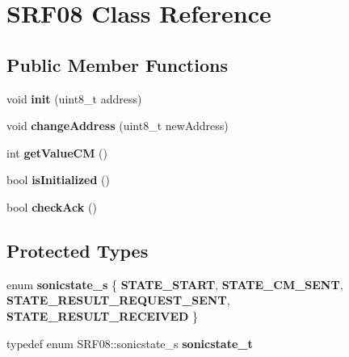 \hypertarget{class_s_r_f08}{}\section{S\+R\+F08 Class Reference}
\label{class_s_r_f08}
\subsection*{Public Member Functions}
\begin{DoxyCompactItemize}
\item 
void {\bfseries init} (uint8\+\_\+t address)\hypertarget{class_s_r_f08_a2f2920aeafb6916589c1a9a7f2443dc6}{}\label{class_s_r_f08_a2f2920aeafb6916589c1a9a7f2443dc6}

\item 
void {\bfseries change\+Address} (uint8\+\_\+t new\+Address)\hypertarget{class_s_r_f08_a3b94c05d2c9aa0bbdde496f637875a4c}{}\label{class_s_r_f08_a3b94c05d2c9aa0bbdde496f637875a4c}

\item 
int {\bfseries get\+Value\+CM} ()\hypertarget{class_s_r_f08_abe78d5649f8bade345a5e42cd6bc84ce}{}\label{class_s_r_f08_abe78d5649f8bade345a5e42cd6bc84ce}

\item 
bool {\bfseries is\+Initialized} ()\hypertarget{class_s_r_f08_a0e0d9a2064498f8c5c862c1c8f0c35f6}{}\label{class_s_r_f08_a0e0d9a2064498f8c5c862c1c8f0c35f6}

\item 
bool {\bfseries check\+Ack} ()\hypertarget{class_s_r_f08_a5b96dc2b670aee3c86917b5dae2c5f7e}{}\label{class_s_r_f08_a5b96dc2b670aee3c86917b5dae2c5f7e}

\end{DoxyCompactItemize}
\subsection*{Protected Types}
\begin{DoxyCompactItemize}
\item 
enum {\bfseries sonicstate\+\_\+s} \{ {\bfseries S\+T\+A\+T\+E\+\_\+\+S\+T\+A\+RT}, 
{\bfseries S\+T\+A\+T\+E\+\_\+\+C\+M\+\_\+\+S\+E\+NT}, 
{\bfseries S\+T\+A\+T\+E\+\_\+\+R\+E\+S\+U\+L\+T\+\_\+\+R\+E\+Q\+U\+E\+S\+T\+\_\+\+S\+E\+NT}, 
{\bfseries S\+T\+A\+T\+E\+\_\+\+R\+E\+S\+U\+L\+T\+\_\+\+R\+E\+C\+E\+I\+V\+ED}
 \}\hypertarget{class_s_r_f08_ae6342593f4cbbabb7d31e4b0ba4051ce}{}\label{class_s_r_f08_ae6342593f4cbbabb7d31e4b0ba4051ce}

\item 
typedef enum S\+R\+F08\+::sonicstate\+\_\+s {\bfseries sonicstate\+\_\+t}\hypertarget{class_s_r_f08_a9de77ac90d87a1bc48f36e6aa961ebc0}{}\label{class_s_r_f08_a9de77ac90d87a1bc48f36e6aa961ebc0}

\end{DoxyCompactItemize}

